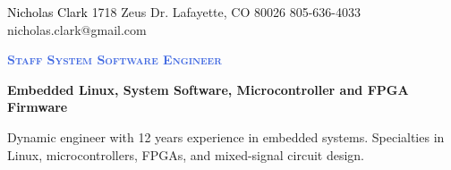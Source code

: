 \documentclass[letterpaper, 10pt]{article}
\newcommand{\NrcColorName}{Black}
\newcommand{\NrcColorTitle}{RoyalBlue}
\begin{document}
%
\nrctitle
{\textcolor{\NrcColorName}{Nicholas Clark}}
{1718 Zeus Dr.}
{Lafayette, CO 80026}
{805-636-4033}
{nicholas.clark@gmail.com}
%
\begin{center}\par\smallskip
\textcolor{\NrcColorTitle}{\Large \textbf{\textsc{Staff System Software Engineer}}}\par
\large \textbf{{Embedded Linux, System Software, Microcontroller and FPGA Firmware}}\par
\smallskip
\noindent \begin{minipage}[t]{0.75\textwidth}%
\begin{center}
Dynamic engineer with 12 years experience in embedded systems. Specialties in
Linux, microcontrollers, FPGAs, and mixed-signal circuit design.
\end{center}
\end{minipage}
\end{center}
\par \smallskip \smallskip
%
%
\end{document}
